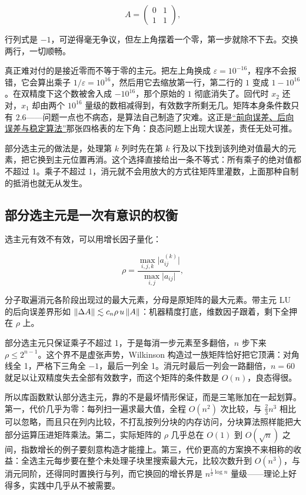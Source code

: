\[
A=\begin{pmatrix}0&1\\1&1\end{pmatrix},
\]

行列式是 \(-1\)，可逆得毫无争议，但左上角摆着一个零，第一步就除不下去。交换两行，一切顺畅。

真正难对付的是接近零而不等于零的主元。把左上角换成 \(\varepsilon=10^{-16}\)，程序不会报错，它会算出乘子 \(1/\varepsilon=10^{16}\)，然后用它去缩放第一行，第二行的 \(1\) 变成 \(1-10^{16}\)。在双精度下这个数被舍入成 \(-10^{16}\)，那个原始的 \(1\) 彻底消失了。回代时 \(x_2\) 还对，\(x_1\) 却由两个 \(10^{16}\) 量级的数相减得到，有效数字所剩无几。矩阵本身条件数只有 \(2.6\)——问题一点也不病态，是算法自己制造了灾难。这正是\hyperref[sec:08-Numerical-Analysis/01-Floating-Point-and-Error/04]{``前向误差、后向误差与稳定算法''}那张四格表的左下角：良态问题上出现大误差，责任无处可推。

部分选主元的做法是，处理第 \(k\) 列时先在第 \(k\) 行及以下找到该列绝对值最大的元素，把它换到主元位置再消。这个选择直接给出一条不等式：所有乘子的绝对值都不超过 1。乘子不超过 1，消元就不会用放大的方式往矩阵里灌数，上面那种自制的抵消也就无从发生。

\subsection{部分选主元是一次有意识的权衡}

选主元有效不有效，可以用增长因子量化：

\[
\rho=\frac{\max_{i,j,k}\bigl\lvert a_{ij}^{(k)}\bigr\rvert}{\max_{i,j}\lvert a_{ij}\rvert},
\]

分子取遍消元各阶段出现过的最大元素，分母是原矩阵的最大元素。带主元 LU 的后向误差界形如 \(\left\lVert\Delta A\right\rVert\lesssim c_n\rho\,u\left\lVert A\right\rVert\)：机器精度打底，维数因子跟着，剩下全押在 \(\rho\) 上。

部分选主元只保证乘子不超过 1，于是每消一步元素至多翻倍，\(n\) 步下来 \(\rho\le2^{n-1}\)。这个界不是虚张声势，Wilkinson 构造过一族矩阵恰好把它顶满：对角线全 1，严格下三角全 \(-1\)，最后一列全 1。消元时最后一列会一路翻倍，\(n=60\) 就足以让双精度失去全部有效数字，而这个矩阵的条件数是 \(O(n)\)，良态得很。

所以库函数默认部分选主元，靠的不是最坏情形保证，而是三笔账加在一起划算。第一，代价几乎为零：每列扫一遍求最大值，全程 \(O(n^2)\) 次比较，与 \(\tfrac23n^3\) 相比可以忽略，而且只在列内比较，不打乱按列分块的内存访问，分块算法照样能把大部分运算压进矩阵乘法。第二，实际矩阵的 \(\rho\) 几乎总在 \(O(1)\) 到 \(O(\sqrt n)\) 之间，指数增长的例子要刻意构造才能撞上。第三，代价更高的方案换不来相称的收益：全选主元每步要在整个未处理子块里搜索最大元，比较次数升到 \(O(n^3)\)，与消元同阶，还得同时置换行与列，而它换回的增长界是 \(n^{\frac12\log n}\) 量级——理论上好得多，实践中几乎从不被需要。

